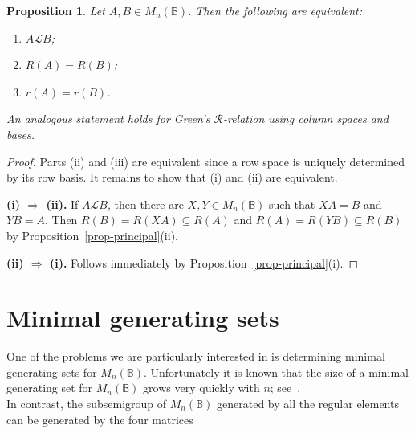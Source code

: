 \documentclass[11pt]{article}
\newtheorem{prop}[thm]{Proposition}
\numberwithin{equation}{section}
\newcommand{\B}{\mathbb{B}}
\newcommand{\Bn}{M_n(\B)}
\renewcommand{\L}{\mathscr{L}}
\newcommand{\R}{\mathscr{R}}
\begin{document}

\begin{prop} 
  Let $A, B \in \Bn$. Then the following are equivalent:
  \begin{enumerate}[\rm (i)]
    \item 
      $A \L B$;

    \item 
      $R(A) = R(B)$;

    \item 
      $r(A) = r(B)$.
  \end{enumerate}
  An analogous statement holds for Green's $\R$-relation using column spaces
  and bases. 
\end{prop}
\begin{proof}
  Parts (ii) and (iii) are equivalent since a row space is uniquely determined
  by its row basis. It remains to show that (i) and (ii) are
  equivalent.\bigskip

  \textbf{(i) $\Rightarrow$ (ii).} 
  If $A \L B$, then there are 
  $X, Y \in \Bn$ such that $XA = B$ and $YB = A$. Then $R(B) = R(XA) \subseteq
  R(A)$ and $R(A) = R(YB) \subseteq R(B)$ by
  Proposition~\ref{prop-principal}(ii).
  \bigskip

  \textbf{(ii) $\Rightarrow$ (i).} Follows immediately by
  Proposition~\ref{prop-principal}(i). 
\end{proof}


\section{Minimal generating sets}

One of the problems we are particularly interested in is determining minimal
generating sets for $\Bn$. Unfortunately it is known that the size of a minimal
generating set for $\Bn$ grows very quickly with $n$;
see~.\\


In contrast, the subsemigroup of $\Bn$ generated by all the regular elements can
be generated by the four matrices \cite{Roush1977aa}
\end{document}
